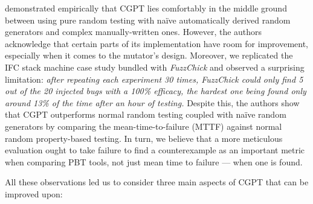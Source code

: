 \documentclass[sigconf, anonymous, review]{acmart}
\newcommand{\fuzzchick}{\textit{FuzzChick}\xspace}
\begin{document}
\citeauthor{lampropoulos2019coverage} demonstrated empirically that CGPT lies
comfortably in the middle ground between using pure random testing with na\"ive
automatically derived random generators and complex manually-written ones.
%
%
However, the authors acknowledge that certain parts of its implementation have
room for improvement, especially when it comes to the mutator's design.
%
%
Moreover, we replicated the IFC stack machine case study bundled with \fuzzchick
and observed a surprising limitation:
%
\emph{after repeating each experiment 30 times, \fuzzchick could only find 5 out
  of the 20 injected bugs with a 100\% efficacy, the hardest one being found
  only around 13\% of the time after an hour of testing.}
%
Despite this, the authors show that CGPT outperforms normal random testing
coupled with na\"ive random generators by comparing the mean-time-to-failure
(MTTF) against normal random property-based testing.
%
In turn, we believe that a more meticulous evaluation ought to take failure to find a
counterexample as an important metric when comparing PBT tools, not just mean
time to failure --- when one is found.
%

All these observations led us to consider three main aspects of CGPT that can be
improved upon:
%
%
%
%
\end{document}
